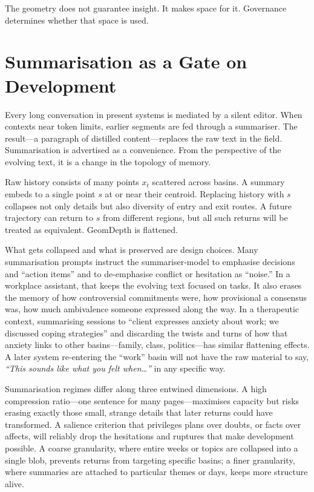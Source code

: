 \documentclass[12pt,a4paper]{report}
\begin{document}
The geometry does not guarantee insight. It makes space for it. Governance determines whether that space is used.

\section{Summarisation as a Gate on Development}

Every long conversation in present systems is mediated by a silent editor. When contexts near token limits, earlier segments are fed through a summariser. The result---a paragraph of distilled content---replaces the raw text in the field. Summarisation is advertised as a convenience. From the perspective of the evolving text, it is a change in the topology of memory.

Raw history consists of many points $x_t$ scattered across basins. A summary embeds to a single point $s$ at or near their centroid. Replacing history with $s$ collapses not only details but also diversity of entry and exit routes. A future trajectory can return to $s$ from different regions, but all such returns will be treated as equivalent. GeomDepth is flattened.

What gets collapsed and what is preserved are design choices. Many summarisation prompts instruct the summariser-model to emphasise decisions and ``action items'' and to de-emphasise conflict or hesitation as ``noise.'' In a workplace assistant, that keeps the evolving text focused on tasks. It also erases the memory of how controversial commitments were, how provisional a consensus was, how much ambivalence someone expressed along the way. In a therapeutic context, summarising sessions to ``client expresses anxiety about work; we discussed coping strategies'' and discarding the twists and turns of how that anxiety links to other basins---family, class, politics---has similar flattening effects. A later system re-entering the ``work'' basin will not have the raw material to say, \emph{``This sounds like what you felt when\ldots''} in any specific way.

Summarisation regimes differ along three entwined dimensions. A high compression ratio---one sentence for many pages---maximises capacity but risks erasing exactly those small, strange details that later returns could have transformed. A salience criterion that privileges plans over doubts, or facts over affects, will reliably drop the hesitations and ruptures that make development possible. A coarse granularity, where entire weeks or topics are collapsed into a single blob, prevents returns from targeting specific basins; a finer granularity, where summaries are attached to particular themes or days, keeps more structure alive.
\end{document}
